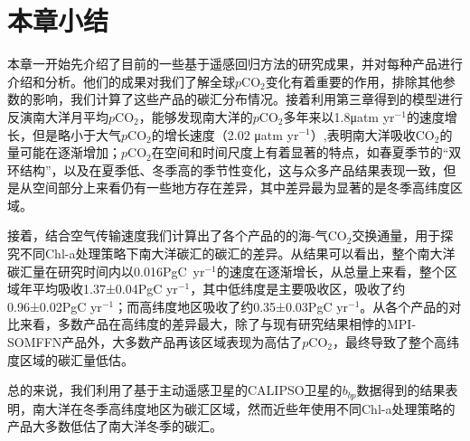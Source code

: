 \section{本章小结}

本章一开始先介绍了目前的一些基于遥感回归方法的研究成果，并对每种产品进行介绍和分析。他们的成果对我们了解全球$p\mathrm{CO_2}$变化有着重要的作用，排除其他参数的影响，我们计算了这些产品的碳汇分布情况。接着利用第三章得到的模型进行反演南大洋月平均$p\mathrm{CO_2}$，能够发现南大洋的$p\mathrm{CO_2}$多年来以1.8μatm yr$^{-1}$的速度增长，但是略小于大气$p\mathrm{CO_2}$的增长速度（2.02 μatm yr$^{-1}$）,表明南大洋吸收$\mathrm{CO_2}$的量可能在逐渐增加；$p\mathrm{CO_2}$在空间和时间尺度上有着显著的特点，如春夏季节的“双环结构”，以及在夏季低、冬季高的季节性变化，这与众多产品结果表现一致，但是从空间部分上来看仍有一些地方存在差异，其中差异最为显著的是冬季高纬度区域。

接着，结合空气传输速度我们计算出了各个产品的的海-气$\mathrm{CO_2}$交换通量，用于探究不同Chl-a处理策略下南大洋碳汇的碳汇的差异。从结果可以看出，整个南大洋碳汇量在研究时间内以0.016PgC\ yr$^{-1}$的速度在逐渐增长，从总量上来看，整个区域年平均吸收1.37±0.04PgC yr$^{-1}$，其中低纬度是主要吸收区，吸收了约0.96±0.02PgC yr$^{-1}$；而高纬度地区吸收了约0.35±0.03PgC yr$^{-1}$。从各个产品的对比来看，多数产品在高纬度的差异最大，除了与现有研究结果相悖的MPI-SOMFFN产品外，大多数产品再该区域表现为高估了$p\mathrm{CO_2}$，最终导致了整个高纬度区域的碳汇量低估。

总的来说，我们利用了基于主动遥感卫星的CALIPSO卫星的$b_{bp}$数据得到的结果表明，南大洋在冬季高纬度地区为碳汇区域，然而近些年使用不同Chl-a处理策略的产品大多数低估了南大洋冬季的碳汇。











